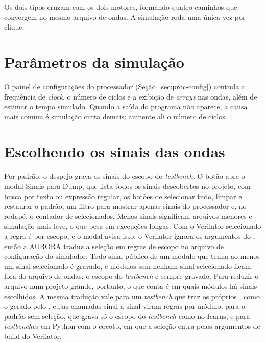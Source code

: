 Os dois tipos cruzam com os dois motores, formando quatro caminhos que convergem no mesmo arquivo de ondas. A simulação roda uma única vez por clique.

\section{Parâmetros da simulação}

O painel de configurações do processador (Seção~\ref{sec:proc-config}) controla a frequência de \textit{clock}, o número de ciclos e a exibição de \textit{arrays} nas ondas, além de estimar o tempo simulado. Quando a saída do programa não aparece, a causa mais comum é simulação curta demais; aumente ali o número de ciclos.

\section{Escolhendo os sinais das ondas}
\label{sec:wave-config}

Por padrão, o despejo grava os sinais do escopo do \textit{testbench}. O botão  abre o modal Sinais para Dump, que lista todos os sinais descobertos no projeto, com busca por texto ou expressão regular, os botões de selecionar tudo, limpar e restaurar o padrão, um filtro para mostrar apenas sinais do processador e, no rodapé, o contador de selecionados. Menos sinais significam arquivos menores e simulação mais leve, o que pesa em execuções longas. Com o Verilator selecionado a regra é por escopo, e o modal avisa isso: o Verilator ignora os argumentos do , então a AURORA traduz a seleção em regras de escopo no arquivo de configuração do simulador. Todo sinal público de um módulo que tenha ao menos um sinal selecionado é gravado, e módulos sem nenhum sinal selecionado ficam fora do arquivo de ondas; o escopo do \textit{testbench} é sempre gravado. Para reduzir o arquivo num projeto grande, portanto, o que conta é em quais módulos há sinais escolhidos. A mesma tradução vale para um \textit{testbench} que traz os próprios , como o gerado pelo , cujas chamadas sinal a sinal viram regras por módulo, para o padrão sem seleção, que grava só o escopo do \textit{testbench} como no Icarus, e para \textit{testbenches} em Python com o cocotb, em que a seleção entra pelos argumentos de build do Verilator.


